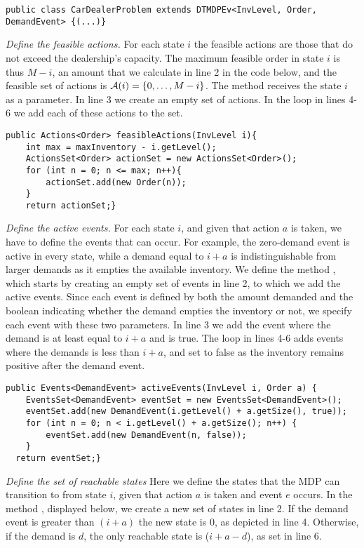 \begin{lstlisting}
public class CarDealerProblem extends DTMDPEv<InvLevel, Order, DemandEvent> {(...)}
\end{lstlisting}

\emph{Define the feasible actions.} 
For each state $i$ the feasible actions are those that do not exceed the
dealership's capacity. The maximum feasible order in state $i$ is thus $M-i$,
an amount that we calculate in line 2 in the code below, and the feasible set
of actions is $\mA(i) =\{0,\ldots,M-i\}$. The method 
receives the state $i$ as a parameter. In line 3 we create an empty set of
actions. In the loop in lines 4-6 we add each of these actions to the set.

\begin{lstlisting}
public Actions<Order> feasibleActions(InvLevel i){
	int max = maxInventory - i.getLevel();
	ActionsSet<Order> actionSet = new ActionsSet<Order>();
	for (int n = 0; n <= max; n++){
		actionSet.add(new Order(n));
	}
	return actionSet;}
\end{lstlisting}

\emph{Define the active events.} For each state $i$, and given that action $a$
is taken, we have to define the events that can occur. For example, the
zero-demand event is active in every state, while a demand equal to $i+a$ is
indistinguishable from larger demands as it empties the available inventory.
We define the method , which starts by creating an empty
set of events  in line 2, to which we add the active events.
Since each event is defined by both the amount demanded and the boolean
 indicating whether the demand empties the inventory or
not, we specify each event with these two parameters. In line 3 we add the
event where the demand is at least equal to $i+a$ and  is
true. The loop in lines 4-6 adds events where the demands is less than $i+a$,
and set  to false as the inventory remains positive after
the demand event.
\begin{lstlisting}
public Events<DemandEvent> activeEvents(InvLevel i, Order a) {
	EventsSet<DemandEvent> eventSet = new EventsSet<DemandEvent>();
	eventSet.add(new DemandEvent(i.getLevel() + a.getSize(), true));
	for (int n = 0; n < i.getLevel() + a.getSize(); n++) {
		eventSet.add(new DemandEvent(n, false));
	}
  return eventSet;}
\end{lstlisting}


\emph{Define the set of reachable states} Here we define the states that the
MDP can transition to from state $i$, given that action $a$ is taken and event
$e$ occurs. In the method , displayed below, we create a new
set of states in line 2. If the demand event is greater than $(i+a)$ the new
state is $0$, as depicted in line 4. Otherwise, if the demand is $d$, the only
reachable state is ($i+a-d$), as set in line 6.

